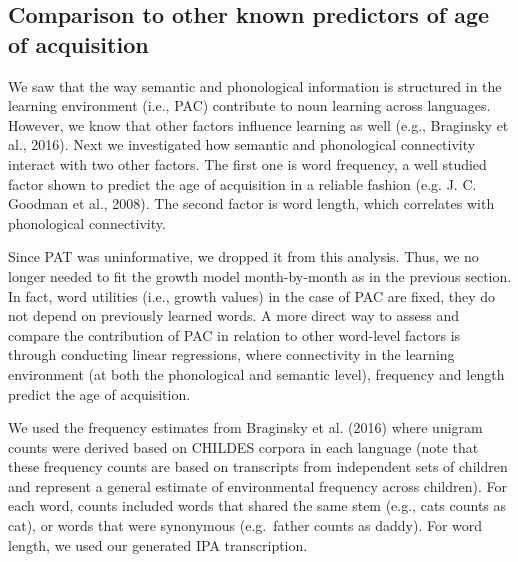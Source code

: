 \documentclass[10pt, letterpaper]{article}
\begin{document}
\subsection{Comparison to other known predictors of age of
acquisition}\label{comparison-to-other-known-predictors-of-age-of-acquisition}

We saw that the way semantic and phonological information is structured
in the learning environment (i.e., PAC) contribute to noun learning
across languages. However, we know that other factors influence learning
as well (e.g., Braginsky et al., 2016). Next we investigated how
semantic and phonological connectivity interact with two other factors.
The first one is word frequency, a well studied factor shown to predict
the age of acquisition in a reliable fashion (e.g. J. C. Goodman et al.,
2008). The second factor is word length, which correlates with
phonological connectivity.

Since PAT was uninformative, we dropped it from this analysis. Thus, we
no longer needed to fit the growth model month-by-month as in the
previous section. In fact, word utilities (i.e., growth values) in the
case of PAC are fixed, they do not depend on previously learned words. A
more direct way to assess and compare the contribution of PAC in
relation to other word-level factors is through conducting linear
regressions, where connectivity in the learning environment (at both the
phonological and semantic level), frequency and length predict the age
of acquisition.

We used the frequency estimates from Braginsky et al. (2016) where
unigram counts were derived based on CHILDES corpora in each language
(note that these frequency counts are based on transcripts from
independent sets of children and represent a general estimate of
environmental frequency across children). For each word, counts included
words that shared the same stem (e.g., cats counts as cat), or words
that were synonymous (e.g.~father counts as daddy). For word length, we
used our generated IPA transcription.
\end{document}
